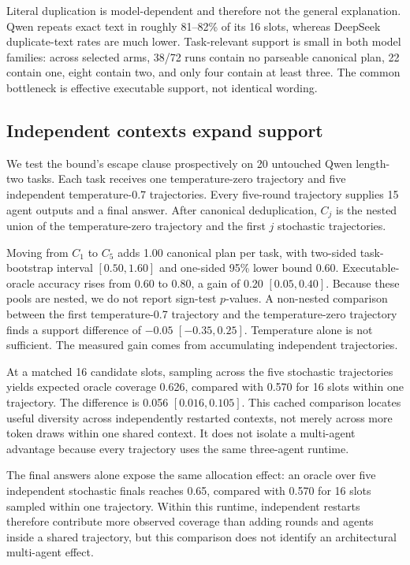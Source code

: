 \documentclass{article}
\begin{document}
Literal duplication is model-dependent and therefore not the general explanation. Qwen repeats exact text in roughly 81--82\% of its 16 slots, whereas DeepSeek duplicate-text rates are much lower. Task-relevant support is small in both model families: across selected arms, 38/72 runs contain no parseable canonical plan, 22 contain one, eight contain two, and only four contain at least three. The common bottleneck is effective executable support, not identical wording.

\subsection{Independent contexts expand support}

We test the bound's escape clause prospectively on 20 untouched Qwen length-two tasks. Each task receives one temperature-zero trajectory and five independent temperature-0.7 trajectories. Every five-round trajectory supplies 15 agent outputs and a final answer. After canonical deduplication, $C_j$ is the nested union of the temperature-zero trajectory and the first $j$ stochastic trajectories.

Moving from $C_1$ to $C_5$ adds 1.00 canonical plan per task, with two-sided task-bootstrap interval $[0.50,1.60]$ and one-sided 95\% lower bound 0.60. Executable-oracle accuracy rises from 0.60 to 0.80, a gain of 0.20 $[0.05,0.40]$. Because these pools are nested, we do not report sign-test $p$-values. A non-nested comparison between the first temperature-0.7 trajectory and the temperature-zero trajectory finds a support difference of $-0.05$ $[-0.35,0.25]$. Temperature alone is not sufficient. The measured gain comes from accumulating independent trajectories.

At a matched 16 candidate slots, sampling across the five stochastic trajectories yields expected oracle coverage 0.626, compared with 0.570 for 16 slots within one trajectory. The difference is 0.056 $[0.016,0.105]$. This cached comparison locates useful diversity across independently restarted contexts, not merely across more token draws within one shared context. It does not isolate a multi-agent advantage because every trajectory uses the same three-agent runtime.

The final answers alone expose the same allocation effect: an oracle over five independent stochastic finals reaches 0.65, compared with 0.570 for 16 slots sampled within one trajectory. Within this runtime, independent restarts therefore contribute more observed coverage than adding rounds and agents inside a shared trajectory, but this comparison does not identify an architectural multi-agent effect.
\end{document}
